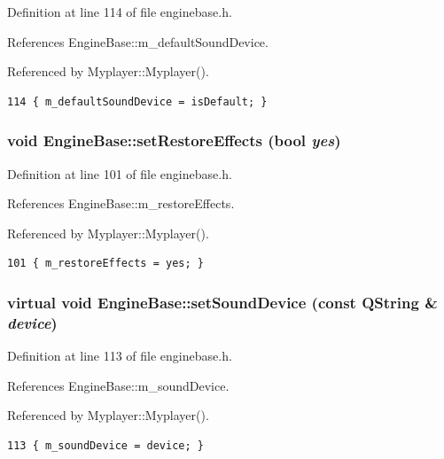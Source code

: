 Definition at line 114 of file enginebase.h.

References Engine\-Base::m\_\-default\-Sound\-Device.

Referenced by Myplayer::Myplayer().



\footnotesize\begin{verbatim}114 { m_defaultSoundDevice = isDefault; }
\end{verbatim}\normalsize 
{}
\subsubsection{\setlength{\rightskip}{0pt plus 5cm}void Engine\-Base::set\-Restore\-Effects (bool {\em yes})\hspace{0.3cm}{\tt  [inline, inherited]}}\label{classEngineBase_EngineBasea15}




Definition at line 101 of file enginebase.h.

References Engine\-Base::m\_\-restore\-Effects.

Referenced by Myplayer::Myplayer().



\footnotesize\begin{verbatim}101 { m_restoreEffects = yes; }
\end{verbatim}\normalsize 
{}
\subsubsection{\setlength{\rightskip}{0pt plus 5cm}virtual void Engine\-Base::set\-Sound\-Device (const QString \& {\em device})\hspace{0.3cm}{\tt  [inline, virtual, inherited]}}\label{classEngineBase_EngineBasea26}




Definition at line 113 of file enginebase.h.

References Engine\-Base::m\_\-sound\-Device.

Referenced by Myplayer::Myplayer().



\footnotesize\begin{verbatim}113 { m_soundDevice = device; }
\end{verbatim}\normalsize 
{}

